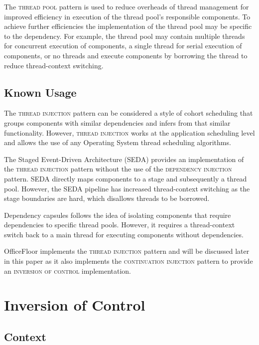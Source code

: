\documentclass[prodmode]{style/acmlarge}
\begin{document}
The \textsc{thread pool} pattern \cite{thread-per-request} is used to reduce
overheads of thread management for improved efficiency in execution of the
thread pool's responsible components.  To achieve further efficiencies the
implementation of the thread pool may be specific to the dependency.  For
example, the thread pool may contain multiple threads for concurrent execution
of components, a single thread for serial execution of components, or no
threads and execute components by borrowing the thread to reduce thread-context
switching.


\subsection{Known Usage}

The \textsc{thread injection} pattern can be considered a style of cohort
scheduling \cite{cohort} that groups components with similar dependencies and
infers from that similar functionality.  However, \textsc{thread injection}
works at the application scheduling level and allows the use of any Operating
System thread scheduling algorithms.

The Staged Event-Driven Architecture (SEDA) \cite{seda} provides an
implementation of the \textsc{thread injection} pattern without the use of the
\textsc{dependency injection} pattern.  SEDA directly maps components to a stage
and subsequently a thread pool.  However, the SEDA pipeline has increased
thread-context switching as the stage boundaries are hard, which disallows
threads to be borrowed.

Dependency capsules \cite{dependency-capsules} follows the idea of isolating
components that require dependencies to specific thread pools.  However, it
requires a thread-context switch back to a main thread for executing components
without dependencies.

OfficeFloor \cite{officefloor} implements the \textsc{thread injection} pattern
and will be discussed later in this paper as it also implements the
\textsc{continuation injection} pattern to provide an \textsc{inversion of control}
implementation.



\section{Inversion of Control}


\subsection{Context}
\end{document}
